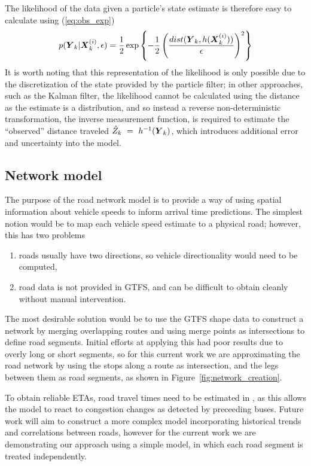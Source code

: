 The likelihood of the data given a particle's state estimate 
is therefore easy to calculate using (\ref{eq:obs_exp})
\begin{equation}
p(\mbox{$\boldsymbol{Y}$}_k | \mbox{$\boldsymbol{X}$}_k^{(i)}, \epsilon) =
\frac{1}{2}\exp\left\{
-\frac{1}{2} \left(\frac{dist(\mbox{$\boldsymbol{Y}$}_k, h(\mbox{$\boldsymbol{X}$}_k^{(i)}))}{\epsilon}\right)^2
\right\}
\end{equation}
It is worth noting that this representation of the likelihood is only
possible due to the discretization of the state provided by the particle filter;
in other approaches, such as the Kalman filter,
the likelihood cannot be calculated using the distance as the estimate
is a distribution, and so instead a reverse non-deterministic transformation,
the inverse measurement function,
is required to estimate the ``observed'' distance traveled $\hat Z_k~=~h^{-1}(\mbox{$\boldsymbol{Y}$}_k)$, 
which introduces additional error and uncertainty into the model.



\subsection{Network model}
\label{sec:kf}

The purpose of the road network model is to provide a way of using
spatial information about vehicle speeds to inform arrival time predictions.
The simplest notion would be to map each vehicle speed estimate to a physical road;
however, this has two problems
\begin{enumerate}
\item roads usually have two directions, so vehicle directionality would need to be computed,
\item road data is not provided in GTFS, and can be difficult to obtain cleanly without
    manual intervention.
\end{enumerate}
The most desirable solution would be to use the GTFS shape data to construct a network
by merging overlapping routes and using merge points as intersections
to define road segments.
Initial efforts at applying this had poor results due to overly long or short segments,
so for this current work we are approximating the road network by using the stops 
along a route as intersection, and the legs between them as road segments,
as shown in Figure~\ref{fig:network_creation}.


To obtain reliable ETAs,
road travel times need to be estimated in \rt,
as this allows the model to react to congestion changes as detected by preceeding buses.
Future work will aim to construct a more complex model incorporating historical trends 
and correlations between roads, 
however for the current work we are demonstrating our approach
using a simple model,
in which each road segment is treated independently.

